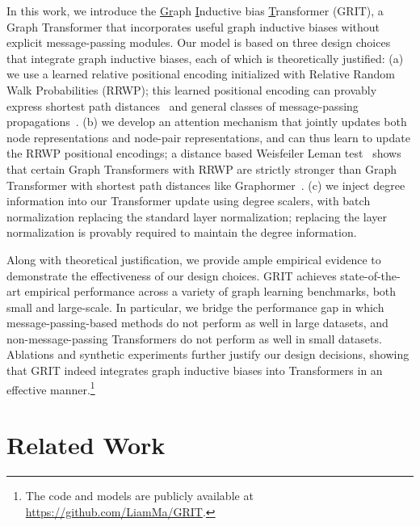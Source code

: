 \documentclass[nohyperref, dvipsnames]{article}
\theoremstyle{plain}
\theoremstyle{definition}
\theoremstyle{remark}
\begin{document}
In this work, we introduce the \underline{Gr}aph \underline{I}nductive bias \underline{T}ransformer (GRIT), a Graph Transformer that incorporates useful graph inductive biases without explicit message-passing modules. Our model is based on three design choices that integrate graph inductive biases, each of which is theoretically justified: (a) we use a learned relative positional encoding initialized with Relative Random Walk Probabilities (RRWP); this learned positional encoding can provably express shortest path distances~\citep{ying2021TransformersReallyPerform} and general classes of message-passing propagations~\citep{gasteiger2019DiffusionImprovesGraph, zhao2021AdaptiveDiffusionGraph, xu2019HowPowerfulAre}. (b) we develop an attention mechanism that jointly updates both node representations and node-pair representations, and can thus learn to update the RRWP positional encodings; a distance based Weisfeiler Leman test~\citep{zhang2023rethinking} shows that certain Graph Transformers with RRWP are strictly stronger than Graph Transformer with shortest path distances like Graphormer~\citep{ying2021TransformersReallyPerform}. (c) we inject degree information into our Transformer update using degree scalers, with batch normalization replacing the standard layer normalization; replacing the layer normalization is provably required to maintain the degree information.



Along with theoretical justification, we provide ample empirical evidence to demonstrate the effectiveness of our design choices. GRIT achieves state-of-the-art empirical performance across a variety of graph learning benchmarks, both small and large-scale. In particular, we bridge the performance gap in which message-passing-based methods do not perform as well in large datasets, and non-message-passing Transformers do not perform as well in small datasets. Ablations and synthetic experiments further justify our design decisions, showing that GRIT indeed integrates graph inductive biases into Transformers in an effective manner.\footnote{The code and models are publicly available at \url{https://github.com/LiamMa/GRIT}.}









\section{Related Work}
\end{document}
